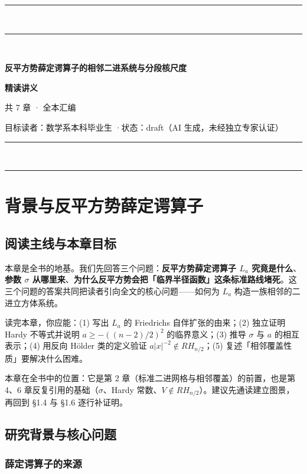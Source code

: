 \documentclass[a4paper,11pt,openany]{ctexbook}
\numberwithin{equation}{chapter}
\numberwithin{figure}{chapter}
\numberwithin{table}{chapter}
\begin{document}
\begin{titlepage}
\centering
{\color{main}\rule{\linewidth}{1.6pt}}\\[0.4cm]
{\color{main}\rule{\linewidth}{0.5pt}}\\[1.8cm]
{\Huge\bfseries\color{main} 反平方势薛定谔算子的相邻二进系统与分段核尺度\par}
{\LARGE\bfseries\color{main!80} 精读讲义\par}
\vspace{1.4cm}
{\large 共 7 章 · 全本汇编\par}
\vfill
{\small\color{black!60} 目标读者：数学系本科毕业生 \quad·\quad 状态：draft（AI 生成，未经独立专家认证）\par}
{\color{main}\rule{\linewidth}{0.5pt}}\\[0.2cm]
{\color{main}\rule{\linewidth}{1.6pt}}\par
\end{titlepage}

\tableofcontents
\clearpage

\chapter{背景与反平方势薛定谔算子}
\section{阅读主线与本章目标}

本章是全书的地基。我们先回答三个问题：\textbf{反平方势薛定谔算子 $L_a$ 究竟是什么}、\textbf{参数 $\sigma$ 从哪里来}、\textbf{为什么反平方势会把「临界半径函数」这条标准路线堵死}。这三个问题的答案共同把读者引向全文的核心问题——如何为 $L_a$ 构造一族相邻的二进立方体系统。

读完本章，你应能：(1) 写出 $L_a$ 的 Friedrichs 自伴扩张的由来；(2) 独立证明 Hardy 不等式并说明 $a\ge-((n-2)/2)^2$ 的临界意义；(3) 推导 $\sigma$ 与 $a$ 的相互表示；(4) 用反向 Hölder 类的定义验证 $a|x|^{-2}\notin RH_{n/2}$；(5) 复述「相邻覆盖性质」要解决什么困难。

本章在全书中的位置：它是第 2 章（标准二进网格与相邻覆盖）的前置，也是第 4、6 章反复引用的基础（$\sigma$、Hardy 常数、$V\notin RH_{n/2}$）。建议先通读建立图景，再回到 §1.4 与 §1.6 逐行补证明。

\section{研究背景与核心问题}

\subsection{薛定谔算子的来源}
\end{document}
